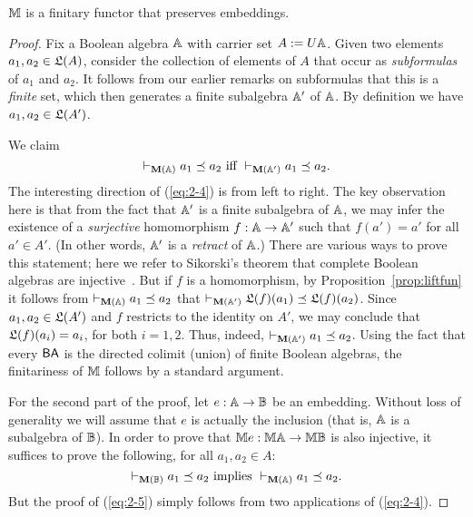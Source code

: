\documentclass{book}
\begin{document}
\begin{proposition}
\label{p:2}
\label{prop:M-finitary}
$\mathbb{M}$ is a finitary functor that preserves embeddings.
\end{proposition}
\xxviproofspace
\begin{proof}
Fix a Boolean algebra $\mathbb{A}$ with carrier set $A := U\mathbb{A}$.
Given two elements $a_{1},a_{2} \in \mathfrak{L}(A)$, 
consider the collection of elements of $A$ that occur as
\emph{subformulas} of 
$a_{1}$ and $a_{2}$.
It follows from our earlier remarks on subformulas that this is a
\emph{finite}
set, which then generates a finite subalgebra $\mathbb{A}'$ of $\mathbb{A}$.
By definition we have $a_{1},a_{2} \in \mathfrak{L}(A')$.

We claim \vspace{-0.5ex} 
\begin{equation}
\label{eq:2-4}
\vdash_{\mathbf{M}(\mathbb{A})} a_{1} \preceq a_{2} \mbox{ iff }
\vdash_{\mathbf{M}(\mathbb{A}')} a_{1} \preceq a_{2}.
\end{equation}
The interesting direction of (\ref{eq:2-4}) is from left to right.
The key observation here is that from the fact that $\mathbb{A}'$ is a
finite
subalgebra of $\mathbb{A}$, we may infer the existence of a
\emph{surjective}
homomorphism $f: \mathbb{A} \to \mathbb{A}'$ such that $f(a') = a'$ for all $a'
\in A'$.
(In other words, $\mathbb{A}'$ is a \emph{retract} of $\mathbb{A}$.)
There are various ways to prove this statement; here we refer to
Sikorski's
theorem that complete Boolean algebras are
injective~\cite{siko:theo48}.
But if $f$ is a homomorphism, by Proposition~\ref{prop:liftfun} it follows
from $\vdash_{\mathbf{M}(\mathbb{A})} a_{1} \preceq a_{2}$ that $\vdash_{\mathbf{M}(\mathbb{A}')}
\mathfrak{L}(f)(a_{1}) \preceq \mathfrak{L}(f)(a_{2})$.
Since $a_{1},a_{2} \in \mathfrak{L}(A')$ and $f$ restricts to the identity on
$A'$, we may conclude that $\mathfrak{L}(f)(a_{i}) = a_{i}$, 
for both $i = 1,2$.
Thus, indeed, $\vdash_{\mathbf{M}(\mathbb{A}')} a_{1} \preceq a_{2}$.
Using the fact that every  $\mathsf{BA}$ is the directed colimit (union) of finite
Boolean algebras, the finitariness of $\mathbb{M}$ follows by a standard argument.

For the second part of the proof, let $e: \mathbb{A} \to \mathbb{B}$ be an
embedding.
Without loss of generality we will assume that $e$ is actually the
inclusion (that is, $\mathbb{A}$ is a subalgebra of $\mathbb{B}$).
In order to prove that $\mathbb{M} e: \mathbb{M}\mathbb{A} \to \mathbb{M}\mathbb{B}$ is also injective, it
suffices to prove the following, for all $a_{1},a_{2} \in A$:
\begin{equation}
\label{eq:2-5}
\vdash_{\mathbf{M}(\mathbb{B})} a_{1} \preceq a_{2} \mbox{ implies } 
\vdash_{\mathbf{M}(\mathbb{A})} a_{1} \preceq a_{2}.
\end{equation}
But the proof of (\ref{eq:2-5}) simply follows from two applications
of 
(\ref{eq:2-4}).
\end{proof}
\end{document}
